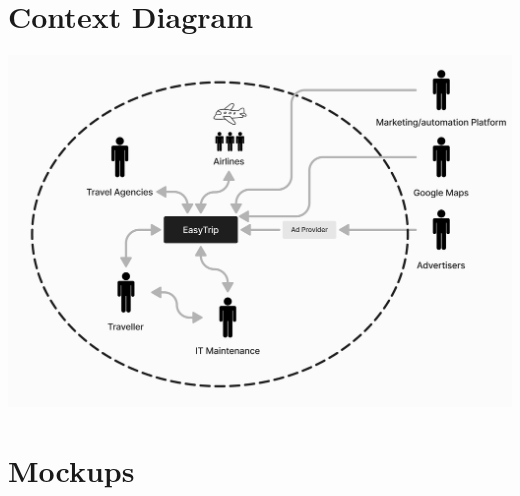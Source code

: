 \documentclass[a4paper]{article}
\begin{document}
\section{Context Diagram}
\includegraphics[width=.99\textwidth]{resources/contextDiagram.png}

\section{Mockups}
\end{document}
